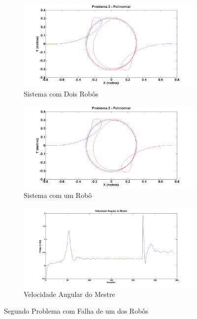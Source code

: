    \begin{figure}[!htb]
   	\centering
   	\begin{subfigure}{1.0\textwidth}
   		\centering
   		\includegraphics[width=.9\linewidth]{./Testes/Problema2/Incremental/2Rb}
   		\caption{Sistema com Dois Robôs}
   		\label{fig:P2Ini}
   	\end{subfigure}
   	\begin{subfigure}{1.0\textwidth}
   		\centering
   		\includegraphics[width=.9\linewidth]{./Testes/Problema2/Incremental/1Rb}
   		\caption{Sistema com um Robô}
   		\label{fig:P2Fim}
   	\end{subfigure}
   	\begin{subfigure}{1.0\textwidth}
   	\centering
   	\includegraphics[width=.9\linewidth]{./Testes/Problema2/Incremental/velAng}
   	\caption{Velocidade Angular do Mestre}
   	\label{fig:P2velAng}
   \end{subfigure}
   	\caption{Segundo Problema com Falha de um dos Robôs}
   	\label{fig:P2}
   \end{figure}
   